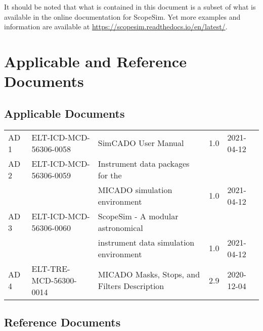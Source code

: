 It should be noted that what is contained in this document is a subset of what is available in the online documentation for ScopeSim.
Yet more examples and information are available at \url{https://scopesim.readthedocs.io/en/latest/}.


\section{Applicable and Reference Documents}
\label{sec:documents}

\subsection{Applicable Documents}

\begin{center}
  \tabletail{\hline}

  \begin{supertabular}{|l|l|l|c|l|}
    AD\,1 & ELT-ICD-MCD-56306-0058 & SimCADO User Manual & 1.0 & 2021-04-12 \\
    AD\,2 & ELT-ICD-MCD-56306-0059 & Instrument data packages for the & & \\
    & & MICADO simulation environment & 1.0 & 2021-04-12 \\
    AD\,3 & ELT-ICD-MCD-56306-0060 & ScopeSim - A modular astronomical & & \\
    & & instrument data simulation environment & 1.0 & 2021-04-12 \\
    AD\,4 & ELT-TRE-MCD-56300-0014 & MICADO Masks, Stops, and Filters Description & 2.9 & 2020-12-04 \\
  \end{supertabular}
\end{center}

\subsection{Reference Documents}

